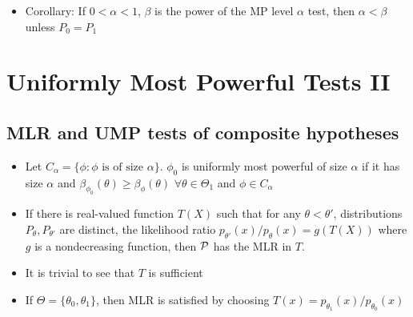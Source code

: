 \documentclass[fontsize=5pt]{scrartcl}
\begin{document}
\begin{multicols}{2}
\begin{itemize}
\item Corollary: If $0<\alpha<1$, $\beta$ is the power of the MP level
  $\alpha$ test, then $\alpha<\beta$ unless $P_{0}=P_{1}$
\end{itemize}

\section{Uniformly Most Powerful Tests II}

\subsection{MLR and UMP tests of composite hypotheses}

\begin{itemize}
\item Let $C_{\alpha} = \{\phi: \phi\text{ is of size
  }\alpha\}$. $\phi_{0}$ is uniformly most powerful of size $\alpha$
  if it has size $\alpha$ and
  $\beta_{\phi_{0}}(\theta)\geq\beta_{\phi}(\theta)$
  $\forall\theta\in\Theta_{1}$ and $\phi\in C_{\alpha}$
\item If there is real-valued function $T(X)$ such that for any
  $\theta<\theta'$, distributions $P_{\theta},P_{\theta'}$ are
  distinct, the likelihood ratio
  $p_{\theta'}(x)/p_{\theta}(x)=g(T(X))$ where $g$ is a nondecreasing
  function, then ${\cal P}$ has the MLR in $T$.
\item It is trivial to see that $T$ is sufficient
\item If $\Theta=\{\theta_{0},\theta_{1}\}$, then MLR is satisfied by
  choosing $T(x) = p_{\theta_{1}}(x)/p_{\theta_{0}}(x)$


\end{itemize}
\end{multicols}
\end{document}
